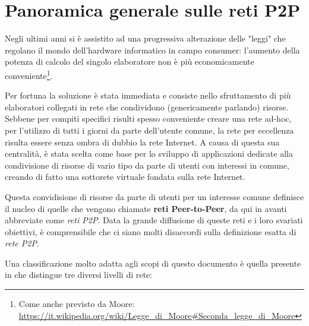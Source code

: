 \chapter{Panoramica generale sulle reti P2P}\label{panoramica-generale-sulle-reti-p2p}

Negli ultimi anni si è assistito ad una progressiva alterazione delle "leggi" che regolano il mondo dell'hardware informatico in campo consumer: l'aumento della potenza di calcolo del singolo elaboratore non è più economicamente conveniente\footnote{Come anche previsto da Moore: \url{https://it.wikipedia.org/wiki/Legge_di_Moore\#Seconda_legge_di_Moore}}.

Per fortuna la soluzione è stata immediata e consiste nello sfruttamento di più elaboratori collegati in rete che condividono (genericamente parlando) risorse. Sebbene per compiti specifici risulti spesso conveniente creare una rete ad-hoc, per l'utilizzo di tutti i giorni da parte dell'utente comune, la rete per eccellenza risulta essere senza ombra di dubbio la rete Internet. A causa di questa sua centralità, è stata scelta come base per lo sviluppo di applicazioni dedicate alla condivisione di risorse di vario tipo da parte di utenti con interessi in comune, creando di fatto una sottorete virtuale fondata sulla rete Internet.

Questa convidisione di risorse da parte di utenti per un interesse comune definisce il nucleo di quelle che vengono chiamate \textbf{reti Peer-to-Peer}, da qui in avanti abbreviate come \emph{reti P2P}. Data la grande diffusione di queste reti e i loro svariati obiettivi, è comprensibile che ci siano molti disaccordi sulla definizione esatta di \emph{rete P2P}.

Una classificazione molto adatta agli scopi di questo documento è quella presente in \cite{core-concepts-p2p} che distingue tre diversi livelli di rete:

